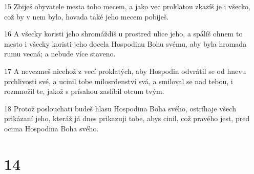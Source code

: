 \par 15 Zbiješ obyvatele mesta toho mecem, a jako vec proklatou zkazíš je i všecko, což by v nem bylo, hovada také jeho mecem pobiješ.
\par 16 A všecky koristi jeho shromáždíš u prostred ulice jeho, a spálíš ohnem to mesto i všecky koristi jeho docela Hospodinu Bohu svému, aby byla hromada rumu vecná; a nebude více staveno.
\par 17 A nevezmeš nicehož z vecí proklatých, aby Hospodin odvrátil se od hnevu prchlivosti své, a ucinil tobe milosrdenství svá, a smiloval se nad tebou, i rozmnožil te, jakož s prísahou zaslíbil otcum tvým.
\par 18 Protož poslouchati budeš hlasu Hospodina Boha svého, ostríhaje všech prikázaní jeho, kteráž já dnes prikazuji tobe, abys cinil, což pravého jest, pred ocima Hospodina Boha svého.

\chapter{14}

